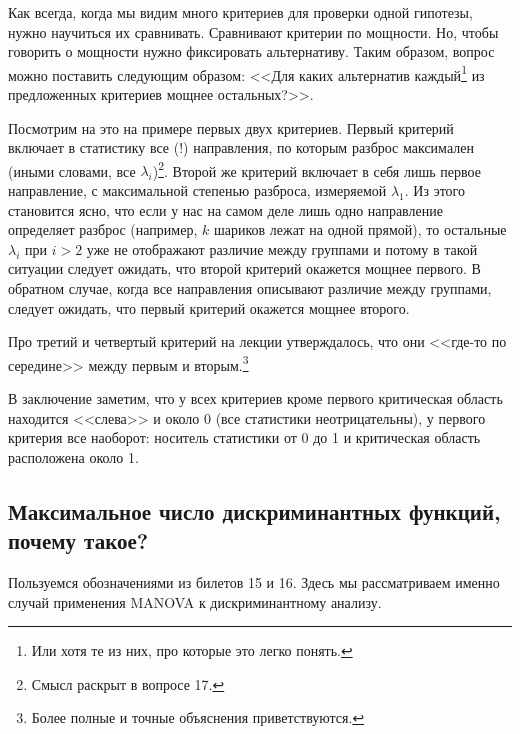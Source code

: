 Как всегда, когда мы видим много критериев для проверки одной гипотезы, нужно научиться их сравнивать.
Сравнивают критерии по мощности. Но, чтобы говорить о мощности нужно фиксировать альтернативу.
Таким образом, вопрос можно поставить следующим образом: <<Для каких альтернатив каждый\footnote{Или хотя те из них, про которые это легко понять.}
из предложенных критериев мощнее остальных?>>.

Посмотрим на это на примере первых двух критериев.
Первый критерий включает в статистику все (!) направления, по которым разброс максимален (иными словами, все $\lambda_i$)\footnote{Смысл раскрыт в вопросе 17.}.
Второй же критерий включает в себя лишь первое направление, с максимальной степенью разброса, измеряемой $\lambda_1$.
Из этого становится ясно, что если у нас на самом деле лишь одно направление определяет разброс (например, $k$ шариков лежат на одной прямой),
то остальные $\lambda_i$ при $i > 2$ уже не отображают различие между группами и потому в такой ситуации следует ожидать, что второй критерий окажется мощнее первого.
В обратном случае, когда все направления описывают различие между группами, следует ожидать, что первый критерий окажется мощнее второго.

Про третий и четвертый критерий на лекции утверждалось, что они <<где-то по середине>> между первым и вторым.\footnote{{\color{blue} Более полные и точные объяснения приветствуются.}}

В заключение заметим, что у всех критериев кроме первого критическая область находится <<слева>> и около 0 (все статистики неотрицательны),
у первого критерия все наоборот: носитель статистики от 0 до 1 и критическая область расположена около 1.

\subsection{Максимальное число дискриминантных функций, почему такое?}

Пользуемся обозначениями из билетов 15 и 16. Здесь мы рассматриваем именно случай применения MANOVA к дискриминантному анализу.

